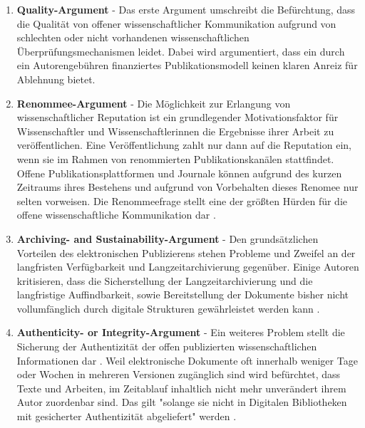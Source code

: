 \begin{enumerate}
\item \textbf{Quality-Argument} - Das erste Argument umschreibt die Befürchtung, dass die Qualität von offener wissenschaftlicher Kommunikation aufgrund von schlechten oder nicht vorhandenen wissenschaftlichen Überprüfungsmechanismen leidet. Dabei wird argumentiert, dass ein durch ein Autorengebühren finanziertes Publikationsmodell keinen klaren Anreiz für Ablehnung bietet.
\item \textbf{Renommee-Argument} - Die Möglichkeit zur Erlangung von wissenschaftlicher Reputation ist ein grundlegender Motivationsfaktor für Wissenschaftler und Wissenschaftlerinnen die Ergebnisse ihrer Arbeit zu veröffentlichen. Eine Veröffentlichung zahlt nur dann auf die Reputation ein, wenn sie im Rahmen von renommierten Publikationskanälen stattfindet. Offene Publikationsplattformen und Journale können aufgrund des kurzen Zeitraums ihres Bestehens und aufgrund von Vorbehalten dieses Renomee nur selten vorweisen. Die Renommeefrage stellt eine der größten Hürden für die offene wissenschaftliche Kommunikation dar \cite{weishaupt_2009_goldenOA}.
\item \textbf{Archiving- and Sustainability-Argument} - Den grundsätzlichen Vorteilen des elektronischen Publizierens stehen Probleme und Zweifel an der langfristen Verfügbarkeit und Langzeitarchivierung \cite{weishaupt_2009_goldenOA} gegenüber. Einige Autoren kritisieren, dass die Sicherstellung der Langzeitarchivierung und die langfristige Auffindbarkeit, sowie Bereitstellung der Dokumente bisher nicht vollumfänglich durch digitale Strukturen gewährleistet werden kann \cite{umstatter_2007_qualitatssicherung} \cite{Gersmann_2007}.
\item \textbf{Authenticity- or Integrity-Argument} - Ein weiteres Problem stellt die Sicherung der Authentizität der offen publizierten wissenschaftlichen Informationen dar \cite{umstatter_2007_qualitatssicherung} \cite{weishaupt_2009_goldenOA}. Weil elektronische Dokumente oft innerhalb weniger Tage oder Wochen in mehreren Versionen zugänglich sind wird befürchtet, dass Texte und Arbeiten, im Zeitablauf inhaltlich nicht mehr unverändert ihrem Autor zuordenbar sind. Das gilt "solange sie nicht in Digitalen Bibliotheken mit gesicherter Authentizität abgeliefert" werden \cite{umstatter_2007_qualitatssicherung}.

\end{enumerate}
